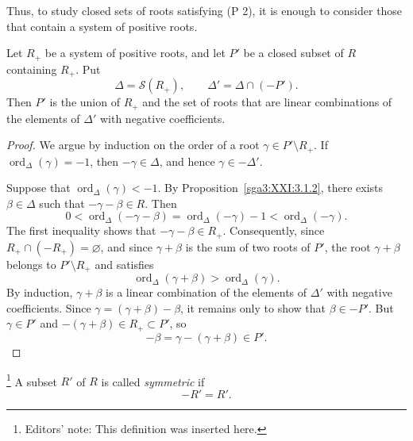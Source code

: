 Thus, to study closed sets of roots satisfying (P 2), it is enough to
consider those that contain a system of positive roots.

\begin{proposition}\label{sga3:XXI:3.3.10}
Let \(R_+\) be a system of positive roots, and let \(P'\) be a closed
subset of \(R\) containing \(R_+\). Put
\[
 \Delta=\mathscr{S}(R_+),
 \qquad
 \Delta'=\Delta\cap(-P').
\]
Then \(P'\) is the union of \(R_+\) and the set of roots that are
linear combinations of the elements of \(\Delta'\) with negative
coefficients.
\end{proposition}

\begin{proof}
We argue by induction on the order of a root
\(\gamma\in P'\setminus R_+\). If
\(\operatorname{ord}_\Delta(\gamma)=-1\), then
\(-\gamma\in\Delta\), and hence \(\gamma\in-\Delta'\).

Suppose that \(\operatorname{ord}_\Delta(\gamma)<-1\). By
Proposition~\ref{sga3:XXI:3.1.2}, there exists \(\beta\in\Delta\)
such that \(-\gamma-\beta\in R\). Then
\[
 0<\operatorname{ord}_\Delta(-\gamma-\beta)
  =\operatorname{ord}_\Delta(-\gamma)-1
  <\operatorname{ord}_\Delta(-\gamma).
\]
The first inequality shows that \(-\gamma-\beta\in R_+\).
Consequently, since \(R_+\cap(-R_+)=\varnothing\), and since
\(\gamma+\beta\) is the sum of two roots of \(P'\), the root
\(\gamma+\beta\) belongs to \(P'\setminus R_+\) and satisfies
\[
 \operatorname{ord}_\Delta(\gamma+\beta)
 >\operatorname{ord}_\Delta(\gamma).
\]
By induction, \(\gamma+\beta\) is a linear combination of the
elements of \(\Delta'\) with negative coefficients. Since
\(\gamma=(\gamma+\beta)-\beta\), it remains only to show that
\(\beta\in-P'\). But \(\gamma\in P'\) and
\(-(\gamma+\beta)\in R_+\subset P'\), so
\[
 -\beta=\gamma-(\gamma+\beta)\in P'.
\]
\end{proof}

\begingroup
\renewcommand{\thetheorem}{3.3.10.1}
\begin{definition}\label{sga3:XXI:3.3.10.1}
\footnote{Editors' note: This definition was inserted here.}
A subset \(R'\) of \(R\) is called \emph{symmetric} if
\[
 -R'=R'.
\]
\end{definition}
\endgroup
\addtocounter{theorem}{-1}


